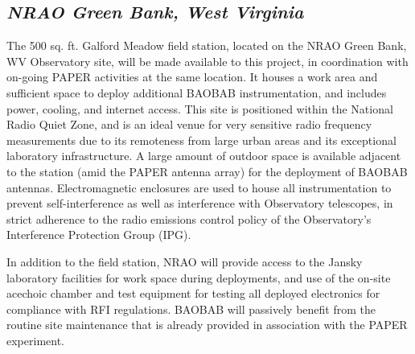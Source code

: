 \documentclass[11pt]{article}
\begin{document}
\subsection*{\it NRAO Green Bank, West Virginia} 

The 500 sq. ft. Galford Meadow field station, located on the NRAO Green Bank, WV 
Observatory site, will be made available to this project, in coordination with
on-going PAPER activities at the same location. It houses a work area and 
sufficient space to deploy additional BAOBAB instrumentation, and includes
power, cooling, and internet access.
This site is positioned within the National Radio Quiet Zone, and is an ideal venue
for very sensitive radio frequency measurements due to its remoteness from
large urban areas and its exceptional laboratory infrastructure. A 
large amount of outdoor space is available adjacent to the station (amid 
the PAPER antenna array) for the
deployment of BAOBAB antennas. 
Electromagnetic enclosures are
used to house all instrumentation to prevent self-interference as well as
interference with Observatory telescopes, in strict adherence to the radio
emissions control policy of the Observatory's Interference Protection Group
(IPG).

In addition to the field station, NRAO will provide access to the Jansky
laboratory facilities for work space during deployments, and use of the on-site
acechoic chamber and test equipment for testing all deployed electronics for
compliance with RFI regulations.  BAOBAB will passively benefit from the routine
site maintenance that is already provided in association with the PAPER
experiment.
\end{document}
